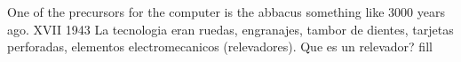 \documentclass{article}
\begin{document}
One of the precursors for the computer is the abbacus something like 3000 years ago. 
XVII 1943
La tecnologia eran ruedas, engranajes, tambor de dientes, tarjetas perforadas, elementos electromecanicos (relevadores).
Que es un relevador? fill
\end{document}
